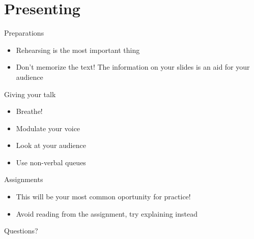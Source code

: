 \documentclass{beamer}
\begin{document}
\section{Presenting}

\begin{frame}[t]{Preparations}
    \begin{itemize}
        \item Rehearsing is the most important thing
        \item Don't memorize the text! The information on your slides is an aid for your audience
    \end{itemize}
\end{frame}
\begin{frame}[t]{Giving your talk}
    \begin{itemize}
        \item Breathe!
        \item Modulate your voice
        \item Look at your audience
        \item Use non-verbal queues
    \end{itemize}
\end{frame}

\begin{frame}[t]{Assignments}
    \begin{itemize}
        \item This will be your most common oportunity for practice!
        \item Avoid reading from the assignment, try explaining instead
    \end{itemize}
\end{frame}

\begin{frame}[c]
  \centering
  \Huge {\color{hbrsblue} Questions?}
\end{frame}
\end{document}

